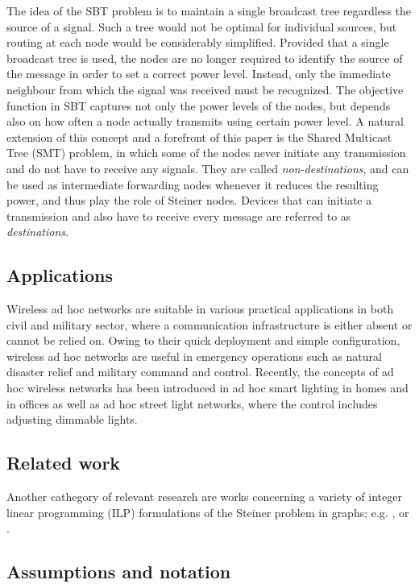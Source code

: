 The idea of the SBT problem is to maintain a single broadcast tree regardless the source of a signal.
Such a tree would not be optimal for individual sources, but routing at each node would be considerably simplified.
Provided that a single broadcast tree is used, the nodes are no longer required to identify the source of the message in order to set a correct power level.
Instead, only the immediate neighbour from which the signal was received must be recognized.
The objective function in SBT captures not only the power levels of the nodes, but depends also on how often a node actually transmits using certain power level.
A natural extension of this concept and a forefront of this paper is the Shared Multicast Tree (SMT) problem, in which some of the nodes never initiate any transmission and do not have to receive any signals.
They are called \emph{non-destinations}, and can be used as intermediate forwarding nodes whenever it reduces the resulting power, and thus play the role of Steiner nodes.
Devices that can initiate a transmission and also have to receive every message are referred to as \emph{destinations}.

\subsection{Applications}

Wireless ad hoc networks are suitable in various practical applications in both civil and military sector, where a communication infrastructure is either absent or cannot be relied on.
Owing to their quick deployment and simple configuration, wireless ad hoc networks are useful in emergency operations such as natural disaster relief and military command and control.
Recently, the concepts of ad hoc wireless networks has been introduced in ad hoc smart lighting in homes and in offices as well as ad hoc street light networks, where the control includes adjusting dimmable lights.
 
\subsection{Related work}

Another cathegory of relevant research are works concerning a variety of integer linear programming (ILP) formulations of the Steiner problem in graphs; e.g. \cite{goemans93catalog}, \cite{Polzin} or \cite{diane93ipf}. 

\subsection{Assumptions and notation}

